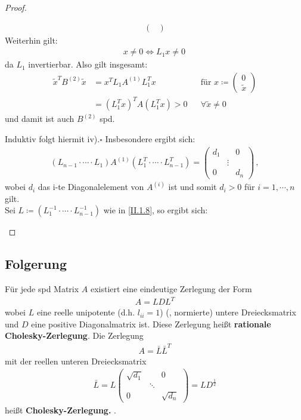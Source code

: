 \documentclass[ngerman,fontsize=11pt, paper=a4, parskip=half, titlepage=true, toc=bib]{scrbook}
\begin{document}
\begin{proof}
\begin{enumerate}[i)]
\begin{align*}
\begin{pmatrix}
						\end{pmatrix} 
			\end{align*}
			Weiterhin gilt:
			\begin{gather*}
				x\neq 0 \Leftrightarrow L_1 x\neq 0 \,
			\end{gather*}
			da $L_1$ invertierbar. Also gilt insgesamt:
			\begin{align*}
				\widetilde{x}^TB^{(2)} \widetilde{x} &= x^T L_1A^{(1)}L_1^Tx
					 &&  \text{für } x\coloneqq \begin{pmatrix}	0 \\ \widetilde{x}\end{pmatrix}\\
				&= (L_1^Tx)^TA(L_1^Tx) > 0
					&& \forall \widetilde{x}\neq 0 
			\end{align*}
			und damit ist auch $B^{(2)}$ spd.
			
			Induktiv folgt hiermit iv).\hfill $\square$
			Insbesondere ergibt sich: 
			\begin{gather*}
				(L_{n-1}\cdot \cdots\cdot L_1)A^{(1)}(L_1^T\cdot \cdots \cdot L_{n-1}^T) 
					= \begin{pmatrix} d_1 & & 0 \\ &\vdots& \\ 0&& d_n\end{pmatrix} \, ,
			\end{gather*}
			wobei $d_i$ das i-te Diagonalelement von $A^{(i)}$ ist und somit $d_i>0$ für $ i= 1, \cdots , n$ gilt. \\
			
			Sei $L\coloneqq (L_1^{-1}\cdot \cdots \cdot L_{n-1}^{-1})$ wie in \eqref{II.1.8}, so ergibt sich:
		\end{enumerate}
\end{proof}		

		\subsection{Folgerung} \label{4.2.2}
		Für jede spd Matrix $A$ existiert eine eindeutige Zerlegung der Form 
			\begin{gather*}
				A= LDL^T
			\end{gather*}
		wobei $L$ eine reelle unipotente (d.h. $l_{ii}=1$)  (, normierte)  untere 
		Dreiecksmatrix  und $D$ eine positive Diagonalmatrix ist. 
		Diese Zerlegung heißt \textbf{rationale Cholesky-Zerlegung}. Die Zerlegung
		\begin{gather}
			A= \bar{L}\bar{L}^T 
	\label{IV.2.2}
		\end{gather}
		mit der reellen unteren Dreiecksmatrix
		\begin{gather*}
			\bar{L} = L \begin{pmatrix}
			\sqrt{d_1} &&0 \\
			& \ddots & \\
			0&& \sqrt{d_n}
			\end{pmatrix} = LD^{\frac{1}{2}}
		\end{gather*}
		heißt \textbf{Cholesky-Zerlegung.} .
		
\end{document}
